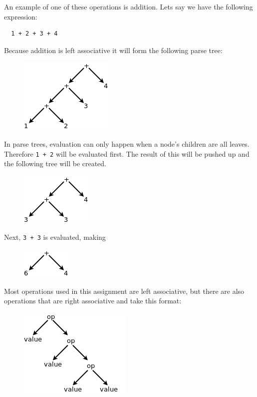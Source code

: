 \documentclass{article}
\newcommand{\code}[1]{\texttt{\textmd{#1}}}
\begin{document}
An example of one of these operations is addition. Lets say we have the following expression:
\begin{lstlisting}
  1 + 2 + 3 + 4
\end{lstlisting}

Because addition is left associative it will form the following parse tree:
\begin{figure}[H]
  \centering
  \includegraphics{static/left-assoc-plus.png}
\end{figure}

In parse trees, evaluation can only happen when a node's children are all leaves. Therefore
\code{1 + 2} will be evaluated first. The result of this will be pushed up and the following tree
will be created.
\begin{figure}[H]
  \centering
  \includegraphics{static/left-assoc-plus-2.png}
\end{figure}

Next, \code{3 + 3} is evaluated, making
\begin{figure}[H]
  \centering
  \includegraphics{static/left-assoc-plus-3.png}
\end{figure}

Most operations used in this assignment are left associative, but there are also operations that
are right associative and take this format:
\begin{figure}[H]
  \centering
  \includegraphics{static/right-assoc-gen.png}
\end{figure}
\end{document}
